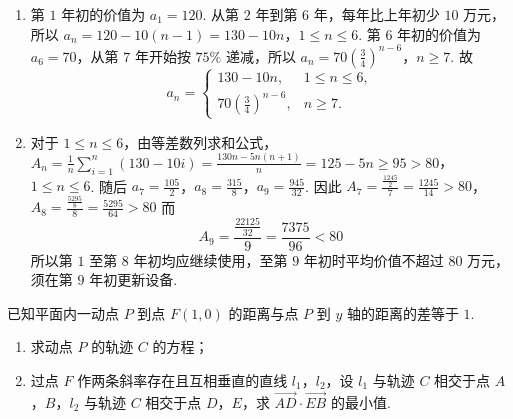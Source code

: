 \begin{solution}
\begin{enumerate}
\item
第 \(1\) 年初的价值为 \(a_1=120\). 从第 \(2\) 年到第 \(6\) 年，每年比上年初少 \(10\) 万元，所以
\(a_n=120-10(n-1)=130-10n\)，\(1\leqslant n\leqslant6\).
第 \(6\) 年初的价值为 \(a_6=70\)，从第 \(7\) 年开始按 \(75\%\) 递减，所以
\(a_n=70\left(\frac34\right)^{n-6}\)，\(n\geqslant7\).
故
\[
a_n=
\begin{cases}
130-10n,&1\leqslant n\leqslant6,\\
70\left(\frac34\right)^{n-6},&n\geqslant7.
\end{cases}
\]

\item
对于 \(1\leqslant n\leqslant6\)，由等差数列求和公式，
\(A_n=\frac{1}{n}\sum_{i=1}^{n}(130-10i) =\frac{130n-5n(n+1)}{n} =125-5n\geqslant95>80\)，\(1\leqslant n\leqslant6\).
随后
\(a_7=\frac{105}{2}\)，\(a_8=\frac{315}{8}\)，\(a_9=\frac{945}{32}\).
因此
\(A_7=\frac{\frac{1245}{2}}7=\frac{1245}{14}>80\)，\(A_8=\frac{\frac{5295}{8}}8=\frac{5295}{64}>80\)
而
\[
A_9=\frac{\frac{22125}{32}}9=\frac{7375}{96}<80
\]
所以第 \(1\) 至第 \(8\) 年初均应继续使用，至第 \(9\) 年初时平均价值不超过 \(80\) 万元，须在第 \(9\) 年初更新设备.
\end{enumerate}
\end{solution}

\begin{problem}
已知平面内一动点 \(P\) 到点 \(F(1,0)\) 的距离与点 \(P\) 到 \(y\) 轴的距离的差等于 \(1\).
\begin{enumerate}
\item 求动点 \(P\) 的轨迹 \(C\) 的方程；
\item 过点 \(F\) 作两条斜率存在且互相垂直的直线 \(l_{1}\)，\(l_{2}\)，设 \(l_{1}\) 与轨迹 \(C\) 相交于点 \(A\)，\(B\)，\(l_{2}\) 与轨迹 \(C\) 相交于点 \(D\)，\(E\)，求 \(\overrightarrow{AD} \cdot \overrightarrow{EB}\) 的最小值.
\end{enumerate}
\end{problem}


